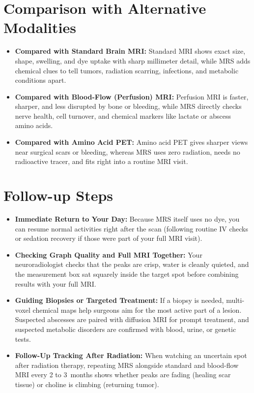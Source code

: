 \section{Comparison with Alternative Modalities}
\begin{itemize}
\item \textbf{Compared with Standard Brain MRI:} Standard MRI shows exact size, shape, swelling, and dye uptake with sharp millimeter detail, while MRS adds chemical clues to tell tumors, radiation scarring, infections, and metabolic conditions apart.
\item \textbf{Compared with Blood-Flow (Perfusion) MRI:} Perfusion MRI is faster, sharper, and less disrupted by bone or bleeding, while MRS directly checks nerve health, cell turnover, and chemical markers like lactate or abscess amino acids.
\item \textbf{Compared with Amino Acid PET:} Amino acid PET gives sharper views near surgical scars or bleeding, whereas MRS uses zero radiation, needs no radioactive tracer, and fits right into a routine MRI visit.
\end{itemize}

\section{Follow-up Steps}
\begin{itemize}
\item \textbf{Immediate Return to Your Day:} Because MRS itself uses no dye, you can resume normal activities right after the scan (following routine IV checks or sedation recovery if those were part of your full MRI visit).
\item \textbf{Checking Graph Quality and Full MRI Together:} Your neuroradiologist checks that the peaks are crisp, water is cleanly quieted, and the measurement box sat squarely inside the target spot before combining results with your full MRI.
\item \textbf{Guiding Biopsies or Targeted Treatment:} If a biopsy is needed, multi-voxel chemical maps help surgeons aim for the most active part of a lesion. Suspected abscesses are paired with diffusion MRI for prompt treatment, and suspected metabolic disorders are confirmed with blood, urine, or genetic tests.
\item \textbf{Follow-Up Tracking After Radiation:} When watching an uncertain spot after radiation therapy, repeating MRS alongside standard and blood-flow MRI every 2 to 3~months shows whether peaks are fading (healing scar tissue) or choline is climbing (returning tumor).
\end{itemize}

